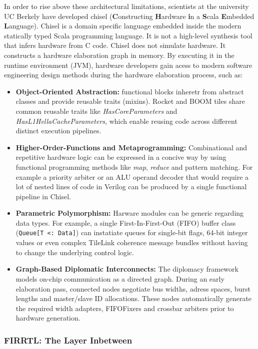 In order to rise above these architectural limitations, 
scientists at the university UC Berkely have developed  \gls{chisel} (\textbf{C}onstructing \textbf{H}ardware \textbf{i}n a \textbf{S}cala \textbf{E}mbedded \textbf{L}anguage). \cite{bachrach2012chisel}
Chisel is a domain specific language embedded inside the modern statically typed Scala programming language.
It is not a high-level synthesis tool that infers hardware from C code.
Chisel does not simulate hardware. It constructs a hardware elaboration graph in memory.
By executing it in the runtime environment (JVM),
hardware developers gain acess to modern software engineering design methods during the hardware elaboration process, such as: 

\begin{itemize}
  \item \textbf{Object-Oriented Abstraction:} functional blocks inheretr from abstract classes and provide reusable traits (mixins).
    Rocket and \gls{BOOM} tiles share common reusable traits like \textit{HasCoreParameters} and \textit{HasL1HellaCacheParameters}, 
    which enable reusing code across different distinct execution pipelines.
  \item \textbf{Higher-Order-Functions and Metaprogramming:} Combinational and repetitive hardware logic can be expressed in a concive way by using functional programming methods like \textit{map}, \textit{reduce} and pattern matching.
    For example a priority arbiter or an ALU operand decoder that would require a lot of nested lines of code in Verilog can be produced by a single functional pipeline in \gls{Chisel}.
  \item \textbf{Parametric Polymorphism:} Harware modules can be generic regarding data types.
    For example, a single First-In-First-Out (FIFO) buffer class (\texttt{Queue[T <: Data]}) can instatiate queues for single-bit flags,
    64-bit integer values or even complex TileLink coherence message bundles without having to change the underlying control logic.
  \item \textbf{Graph-Based Diplomatic Interconnects:} The diplomacy framework models on-chip communication as a directed graph.
    During an early elaboration pass, connected nodes negotiate bus widths, adress spaces, burst lengths and master/slave ID allocations.
    These nodes automatically generate the required width adapters, FIFOFixers and crossbar arbiters prior to hardware generation.
\end{itemize}


\subsubsection{FIRRTL: The Layer Inbetween}

